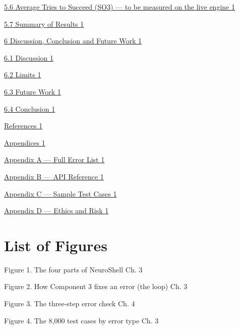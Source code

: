 \documentclass[
]{article}
\begin{document}
\protect\hyperlink{average-tries-to-succeed-so3---to-be-measured-on-the-live-engine}{5.6
Average Tries to Succeed (SO3) --- to be measured on the live engine
\protect\hyperlink{average-tries-to-succeed-so3---to-be-measured-on-the-live-engine}{1}}

\protect\hyperlink{summary-of-results}{5.7 Summary of Results
\protect\hyperlink{summary-of-results}{1}}

\protect\hyperlink{discussion-conclusion-and-future-work}{6 Discussion,
Conclusion and Future Work
\protect\hyperlink{discussion-conclusion-and-future-work}{1}}

\protect\hyperlink{discussion}{6.1 Discussion
\protect\hyperlink{discussion}{1}}

\protect\hyperlink{limits}{6.2 Limits \protect\hyperlink{limits}{1}}

\protect\hyperlink{future-work}{6.3 Future Work
\protect\hyperlink{future-work}{1}}

\protect\hyperlink{conclusion}{6.4 Conclusion
\protect\hyperlink{conclusion}{1}}

\protect\hyperlink{references}{References
\protect\hyperlink{references}{1}}

\protect\hyperlink{appendices}{Appendices
\protect\hyperlink{appendices}{1}}

\protect\hyperlink{appendix-a---full-error-list}{Appendix A --- Full
Error List \protect\hyperlink{appendix-a---full-error-list}{1}}

\protect\hyperlink{appendix-b--api-reference}{Appendix B --- API
Reference \protect\hyperlink{appendix-b--api-reference}{1}}

\protect\hyperlink{appendix-c---sample-test-cases}{Appendix C --- Sample
Test Cases \protect\hyperlink{appendix-c---sample-test-cases}{1}}

\protect\hyperlink{appendix-d---ethics-and-risk}{Appendix D --- Ethics
and Risk \protect\hyperlink{appendix-d---ethics-and-risk}{1}}

\hypertarget{list-of-figures}{%
\section{List of Figures}\label{list-of-figures}}

Figure 1. The four parts of NeuroShell Ch. 3

Figure 2. How Component 3 fixes an error (the loop) Ch. 3

Figure 3. The three-step error check Ch. 4

Figure 4. The 8,000 test cases by error type Ch. 3
\end{document}
